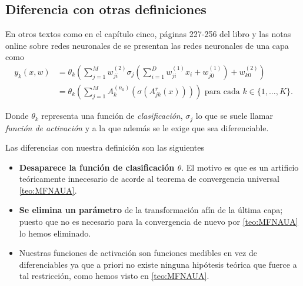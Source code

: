 \subsection*{Diferencia con otras definiciones}  \label{subsection:diferencia-otras-definiciones-RRNN}

En otros textos como en el capítulo cinco, páginas 227-256 del libro \cite{BishopPaterRecognition} y las notas online sobre redes neuronales de \cite{MostafaLearningFromData} se presentan las redes neuronales de una capa como 
\begin{align}
    y_k(x,w) &= \theta_k 
    \left( 
        \sum^M_{j=1} w_{ji}^{(2)}
        \sigma_j 
        \left(
            \sum_{i=1}^D w_{ji}^{(1)} x_i + w_{j0}^{(1)}
        \right)
        + w_{k0}^{(2)}
    \right) 
    \\
    & = 
    \theta_k 
    \left( 
        \sum^M_{j=1} A^{(n_k)}_{k}
        \left(
            \sigma 
            \left(
                A^{r}_{j k}
                \left(
                    x
                \right)
            \right)
        \right)
    \right)
    \text{ para cada  } k \in \{1, \ldots, K \}.
\end{align}

Donde $\theta_k$ representa una función de \textit{clasificación}, 
$\sigma_j$ lo que se suele llamar \textit{función de activación} y a la que además se le exige que sea diferenciable.

Las diferencias con nuestra definición son las siguientes 
\begin{itemize}
    \item \textbf{Desaparece la función de clasificación $\theta$}. El motivo es que es un artificio teóricamente innecesario de acorde al teorema de convergencia universal \ref{teo:MFNAUA}.
    \item \textbf{Se elimina un parámetro} de la transformación afín de la última capa; puesto que no es necesario para la convergencia de nuevo por \ref{teo:MFNAUA} lo hemos eliminado.
    \item Nuestras funciones de activación son funciones medibles en vez de diferenciables ya que a priori no existe ninguna hipótesis teórica que fuerce a tal restricción, como hemos visto en \ref{teo:MFNAUA}.
\end{itemize}
